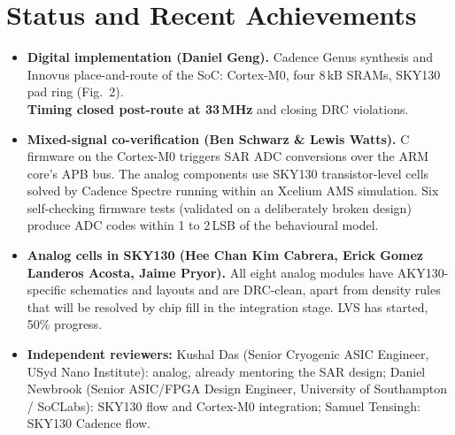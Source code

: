 \documentclass[10pt,a4paper]{article}
\begin{document}
\section{Status and Recent Achievements}
\begin{minipage}[t]{0.56\textwidth}
\vspace{0pt}
\begin{itemize}
\item \textbf{Digital implementation (Daniel Geng).} Cadence Genus synthesis and Innovus place-and-route of the SoC: Cortex-M0, four 8\,kB SRAMs, SKY130 pad ring (Fig.~2).
\\
\textbf{Timing closed post-route at 33\,MHz} and closing DRC violations.
\item \textbf{Mixed-signal co-verification (Ben Schwarz \& Lewis Watts).} C firmware on the Cortex-M0 triggers SAR ADC conversions over the ARM core's APB bus. The analog components use SKY130 transistor-level cells solved by Cadence Spectre running within an Xcelium AMS simulation. Six self-checking firmware tests (validated on a deliberately broken design) produce ADC codes within 1 to 2\,LSB of the behavioural model.
\item \textbf{Analog cells in SKY130 (Hee Chan Kim Cabrera, Erick Gomez Landeros Acosta, Jaime Pryor).} All eight analog modules have AKY130-specific schematics and layouts and are DRC-clean, apart from density rules that will be resolved by chip fill in the integration stage. LVS has started, 50\% progress.
\item \textbf{Independent reviewers:} Kushal Das (Senior Cryogenic ASIC Engineer, USyd Nano Institute): analog, already mentoring the SAR design; Daniel Newbrook (Senior ASIC/FPGA Design Engineer, University of Southampton / SoCLabs): SKY130 flow and Cortex-M0 integration; Samuel Tensingh: SKY130 Cadence flow.
\end{itemize}
\end{minipage}\hfill
\end{document}
